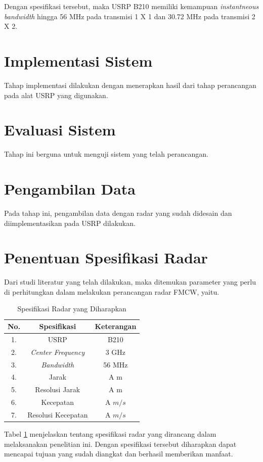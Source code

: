 Dengan spesifikasi tersebut, maka USRP B210 memiliki kemampuan \textit{instantneous bandwidth} hingga 56 MHz pada transmisi 1 X 1 dan 30.72 MHz pada transmisi 2 X 2.

\section{Implementasi Sistem}
Tahap implementasi dilakukan dengan menerapkan hasil dari tahap perancangan pada alat USRP yang digunakan. 

\section{Evaluasi Sistem}
Tahap ini berguna untuk menguji sistem yang telah   perancangan.
	
\section{Pengambilan Data}
Pada tahap ini, pengambilan data dengan radar yang sudah didesain dan diimplementasikan pada USRP dilakukan.

\section{Penentuan Spesifikasi Radar}
Dari studi literatur yang telah dilakukan, maka ditemukan parameter yang perlu di perhitungkan dalam melakukan perancangan radar FMCW, yaitu.
\begin{center}
\begin{longtable}{| c | c | c |}
	\caption[Spesifikasi Radar]{Spesifikasi Radar yang Diharapkan}
	\label{tab:spekRadar}\\
	\hline
	No. & Spesifikasi & Keterangan\\
	\hline
	1. & USRP & B210\\
	2. & \textit{Center Frequency} & 3 GHz \\
	3. & \textit{Bandwidth} & 56 MHz \\
	4. & Jarak & A m \\
	5. & Resolusi Jarak & A m \\
	6.& Kecepatan & A $m/s$ \\
	7. & Resolusi Kecepatan & A $m/s$\\
	\hline
\end{longtable}
\end{center}

Tabel \ref{tab:spekRadar} menjelaskan tentang spesifikasi radar yang dirancang dalam melaksanakan penelitian ini. Dengan spesifikasi tersebut diharapkan dapat mencapai tujuan yang sudah diangkat dan berhasil memberikan manfaat.